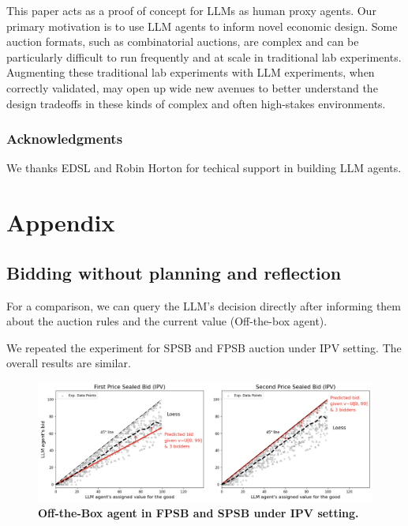 \documentclass{article} %
\begin{document}
This paper acts as a proof of concept for LLMs as human proxy agents. Our primary motivation is to  use LLM agents to inform novel
economic design. Some auction formats, such as combinatorial auctions, are complex and can be  particularly difficult to run frequently and at scale in traditional lab experiments. Augmenting these traditional lab experiments with LLM experiments, when correctly validated, may open up wide new avenues 
to better understand the design tradeoffs in these kinds of complex and often high-stakes environments.


\subsubsection*{Acknowledgments}
We thanks EDSL and Robin Horton for techical support in building LLM agents.





\appendix
\section{Appendix}

\subsection{Bidding without planning and reflection}

For a comparison, we can query the LLM's decision directly after informing them about the auction rules and the current value (Off-the-box agent). 

We repeated the experiment for SPSB and FPSB auction under IPV setting. The overall results are similar.

\begin{figure}[h]
    \centering \includegraphics[width=\linewidth]{Figs/FPSB_off-box.png}
    \caption{\textbf{ Off-the-Box agent in FPSB and SPSB under IPV setting.} }
    \label{fig:fpsb}

\end{figure}
\end{document}
